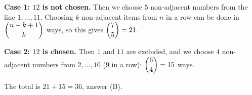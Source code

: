 \textbf{Case 1: $12$ is not chosen.} Then we choose $5$ non-adjacent numbers from the line $1,\dots,11$. Choosing $k$ non-adjacent items from $n$ in a row can be done in $\dbinom{n-k+1}{k}$ ways, so this gives $\dbinom75=21$.

\textbf{Case 2: $12$ is chosen.} Then $1$ and $11$ are excluded, and we choose $4$ non-adjacent numbers from $2,\dots,10$ ($9$ in a row): $\dbinom64=15$ ways.

The total is $21+15=\boxed{36}$, answer (B).
